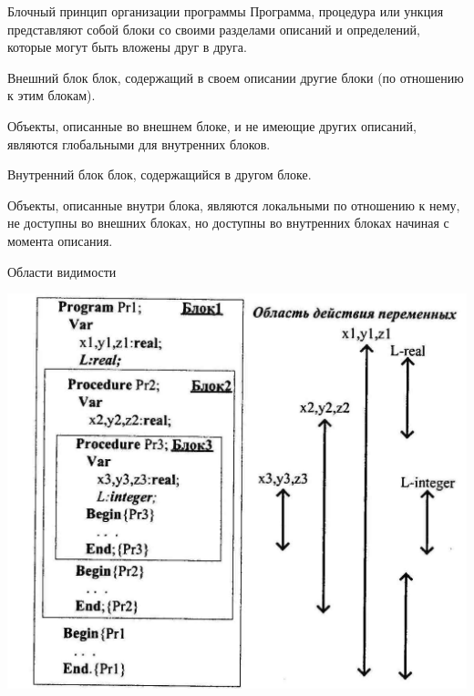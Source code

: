 \documentclass{beamer}
\begin{document}
\begin{frame}{Блочный принцип организации программы}
Программа, процедура или ункция представляют собой блоки со своими разделами описаний и определений, которые могут быть вложены друг в друга. 
\begin{block}{Внешний блок}
блок, содержащий в своем описании другие блоки (по отношению к этим блокам).
\end{block}
Объекты, описанные во внешнем блоке, и не имеющие других описаний, являются глобальными для внутренних блоков.
\begin{block}{Внутренний блок}
блок, содержащийся в другом блоке.
\end{block}
Объекты, описанные внутри блока, являются локальными по отношению к нему, не доступны во внешних блоках, но доступны во внутренних блоках начиная с момента описания. 
\end{frame}

\begin{frame}
\begin{block}{Области видимости}
\begin{center}
\includegraphics[scale=0.8]{images/block.jpg}
\end{center}
\end{block}
\end{frame}
\end{document}
